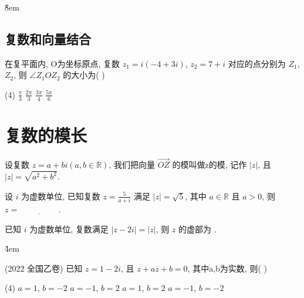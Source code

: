 \v{8em}

\subsection{复数和向量结合}

\begin{example}
    在复平面内, O为坐标原点, 复数 $z_{1}=i(-4+3i)$, $z_{2}=7+i$ 对应的点分别为 $Z_{1}$, $Z_{2}$, 则 $\angle Z_{1}OZ_{2}$ 的大小为( \quad )
    \begin{tasks}(4)
        \task $\frac{\pi}{3}$
        \task $\frac{2\pi}{3}$
        \task $\frac{3\pi}{4}$
        \task $\frac{5\pi}{6}$
    \end{tasks}
\end{example}

\vspace{4em}

\section{复数的模长}

\begin{definition}[复数的模]
    设复数 $z=a+bi(a,b\in \mathbb{R})$, 我们把向量 $\overrightarrow{OZ}$ 的模叫做z的模, 记作 $|z|$, 且 $|z|=\sqrt{a^{2}+b^{2}}$.
\end{definition}

\begin{example}
    设 $i$ 为虚数单位, 已知复数 $z=\frac{5}{a+i}$ 满足 $|z|=\sqrt{5}$, 其中 $a\in \mathbb{R}$ 且 $a>0$, 则 $z= \underline{\hspace{2cm}}$.
\end{example}

\vspace{4em}

\begin{example}
    已知 $i$ 为虚数单位, 复数满足 $|z-2i|=|z|$, 则 $z$ 的虚部为 \underline{\hspace{2cm}}.
\end{example}

\v{4em}

\begin{example}(2022 全国乙卷)
    已知 $z=1-2i$, 且 $z+a\overline{z}+b=0$, 其中a,b为实数, 则( \quad )
    \begin{tasks}(4)
        \task $a=1$, $b=-2$
        \task $a=-1$, $b=2$
        \task $a=1$, $b=2$
        \task $a=-1$, $b=-2$
    \end{tasks}
\end{example}

